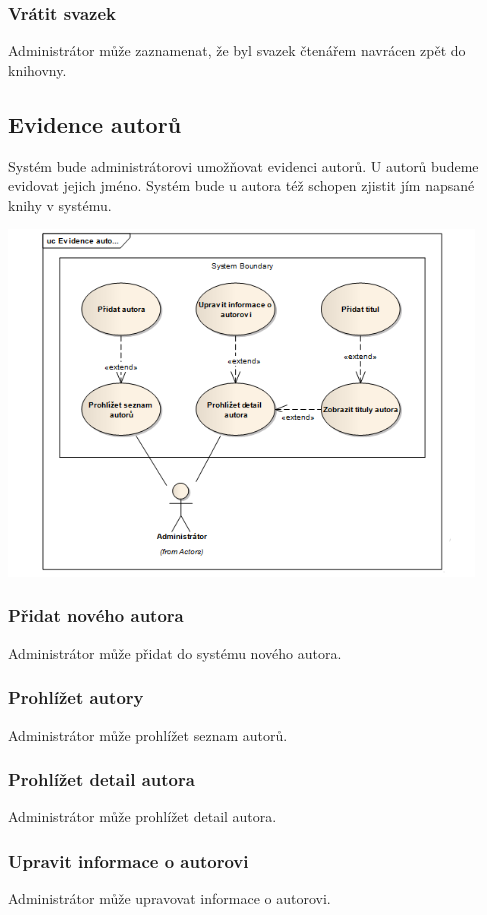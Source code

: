 \documentclass{article}
\begin{document}
\subsubsection{Vrátit svazek}
Administrátor může zaznamenat, že byl svazek čtenářem navrácen zpět do knihovny.


\subsection{Evidence autorů}
Systém bude administrátorovi umožňovat evidenci autorů. U autorů budeme evidovat
jejich jméno. Systém bude u autora též schopen zjistit jím napsané knihy v
systému.

\includegraphics[width=350pt]{img/evidenceautoru.png}
\subsubsection{Přidat nového autora}
Administrátor může přidat do systému nového autora.

\subsubsection{Prohlížet autory}
Administrátor může prohlížet seznam autorů.

\subsubsection{Prohlížet detail autora}
Administrátor může prohlížet detail autora.

\subsubsection{Upravit informace o autorovi}
Administrátor může upravovat informace o autorovi.
\end{document}
